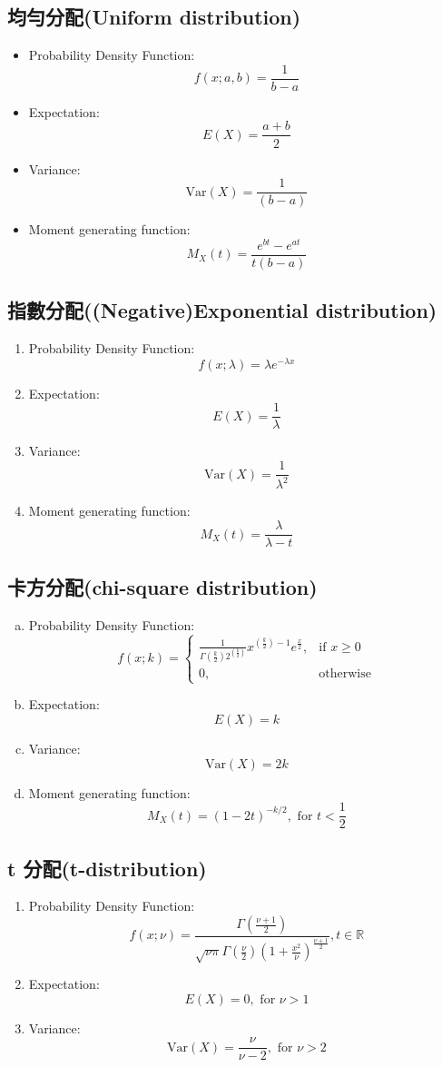 \subsection{均勻分配(Uniform distribution)}
\begin{itemize}
\item Probability Density Function:$$f(x;a,b)=\frac {1}{b-a}$$
\item Expectation:$$E(X) = \frac{a + b}{2}$$
\item Variance:$$\text{Var}(X) = \frac{1}{(b-a)}$$
\item Moment generating function:$$M_X(t) = \frac{e^{bt} - e^{at}}{t(b - a)}$$
\end{itemize}
\subsection{指數分配((Negative)Exponential distribution)}
\begin{enumerate}[1.]
\item Probability Density Function:$$f(x;\lambda)=\lambda e^{-\lambda x}$$
\item Expectation:$$E(X) = \frac{1}{\lambda}$$
\item Variance:$$\text{Var}(X) = \frac{1}{\lambda^2}$$
\item Moment generating function:$$M_X(t) =\frac{\lambda}{\lambda - t}$$
\end{enumerate}
\subsection{卡方分配(chi-square distribution)}
\begin{enumerate}[a.]
\item Probability Density Function:$$f(x; k) = 
\begin{cases}
    \frac{1}{\Gamma(\frac{k}{2})2^{(\frac{k}{2})} } x^{(\frac{k}{2})-1} e^{\frac{x}{2}}, & \text{if } x \geq 0 \\
    0, & \text{otherwise}
\end{cases}$$
\item Expectation:$$E(X) = k$$
\item Variance:$$\text{Var}(X) = 2k$$
\item Moment generating function:$$M_X(t) = (1 - 2t)^{-k/2}, \text{ for } t < \frac{1}{2}$$
\end{enumerate}
\subsection{t 分配(t-distribution)}
\begin{enumerate}[$\bullet$]
\item Probability Density Function:$$f(x; \nu) = \frac{\Gamma\left(\frac{\nu+1}{2}\right)}{\sqrt{\nu\pi} \Gamma\left(\frac{\nu}{2}\right) \left(1+\frac{x^2}{\nu}\right)^{\frac{\nu+1}{2}}},t \in \mathbb{R}$$
\item Expectation:$$E(X) = 0, \text{ for } \nu > 1$$
\item Variance:$$\text{Var}(X) = \frac{\nu}{\nu-2}, \text{ for } \nu > 2$$
\end{enumerate}
